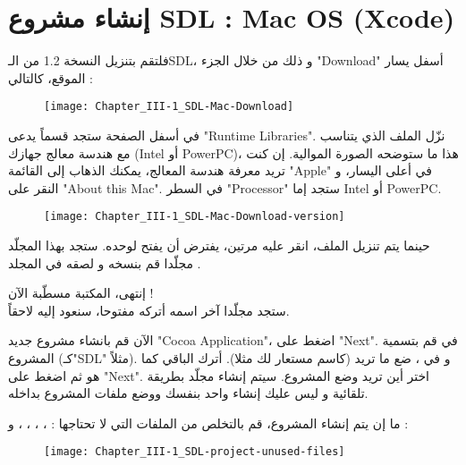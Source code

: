 \section{إنشاء مشروع \textenglish{SDL} : \textenglish{Mac OS} (\textenglish{Xcode})}

فلتقم بتنزيل النسخة 1.2 من الـ\textenglish{SDL}،
و ذلك من خلال الجزء
"\textenglish{Download}"
أسفل يسار الموقع، كالتالي :

\begin{figure}[H]
	\centering
	\texttt{[image: Chapter\_III-1\_SDL-Mac-Download]}
\end{figure}

في أسفل الصفحة ستجد قسماً يدعى 
"\textenglish{Runtime Libraries}".
نزّل الملف الذي يتناسب مع هندسة معالج جهازك
(\textenglish{Intel} أو \textenglish{PowerPC})،
 هذا ما ستوضحه الصورة الموالية. إن كنت تريد معرفة هندسة المعالج، يمكنك الذهاب إلى القائمة 
"\textenglish{Apple}"
في أعلى اليسار، و النقر على 
"\textenglish{About this Mac}".
في السطر 
"\textenglish{Processor}"
ستجد إما
\textenglish{Intel} أو \textenglish{PowerPC}.

\begin{figure}[H]
	\centering
	\texttt{[image: Chapter\_III-1\_SDL-Mac-Download-version]}
\end{figure}

حينما يتم تنزيل الملف، انقر عليه مرتين، يفترض أن يفتح لوحده. ستجد بهذا المجلّد مجلّدا
قم بنسخه و لصقه في المجلد 
.

إنتهى، المكتبة مسطّبة الآن !\\
ستجد مجلّدا آخر اسمه 
أتركه مفتوحا، سنعود إليه لاحقاً.

الآن قم بانشاء مشروع جديد
"\textenglish{Cocoa Application}"،
اضغط على
"\textenglish{Next}".
في 
قم بتسمية المشروع (كـ"\textenglish{SDL}"
مثلاً). و في 
،
ضع ما تريد (كاسم مستعار لك مثلا). أترك الباقي كما هو ثم اضغط على 
"\textenglish{Next}".
اختر أين تريد وضع المشروع. سيتم إنشاء مجلّد بطريقة تلقائية و ليس عليك إنشاء واحد بنفسك ووضع ملفات المشروع بداخله.

ما إن يتم إنشاء المشروع، قم بالتخلص من الملفات التي لا تحتاجها :
، ، ، ،  و  :

\begin{figure}[H]
	\centering
	\texttt{[image: Chapter\_III-1\_SDL-project-unused-files]}
\end{figure}


